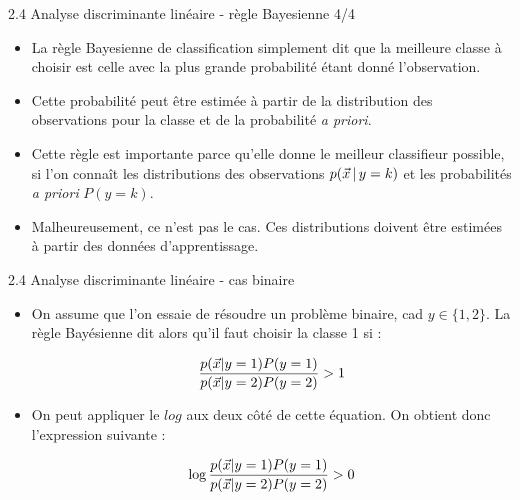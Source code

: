 \begin{frame}{2.4 Analyse discriminante linéaire - règle Bayesienne 4/4}

\begin{itemize}
  \item La règle Bayesienne de classification simplement dit que la meilleure classe à choisir est celle avec la plus grande probabilité étant donné l'observation. 
  \item Cette probabilité peut être estimée à partir de la distribution des observations pour la classe et de la probabilité \emph{a priori}. 
  \item Cette règle est importante parce qu'elle donne le meilleur classifieur possible, si l'on connaît les distributions des observations $p(\vec{x}\,|\,y=k)$ et les probabilités \emph{a priori} $P(y=k)$.
  \item Malheureusement, ce n'est pas le cas. Ces distributions doivent être estimées à partir des données d'apprentissage. 
\end{itemize}

\end{frame}

\begin{frame}{2.4 Analyse discriminante linéaire - cas binaire}

\begin{itemize}
\item On assume que l'on essaie de résoudre un problème binaire, cad $y \in \{1, 2\}$. La règle Bayésienne dit alors qu'il faut choisir la classe 1 si : 

\begin{equation*}
\frac{p(\vec{x}|y=1)P(y=1)}{p(\vec{x}|y=2)P(y=2)} > 1
\end{equation*}

\item On peut appliquer le $log$ aux deux côté de cette équation. On obtient donc l'expression suivante : 

\begin{equation}\label{equ:lda:condition}
\log{ \frac{p(\vec{x}|y=1)P(y=1)}{p(\vec{x}|y=2)P(y=2)} } > 0
\end{equation}
\end{itemize}
\end{frame}

